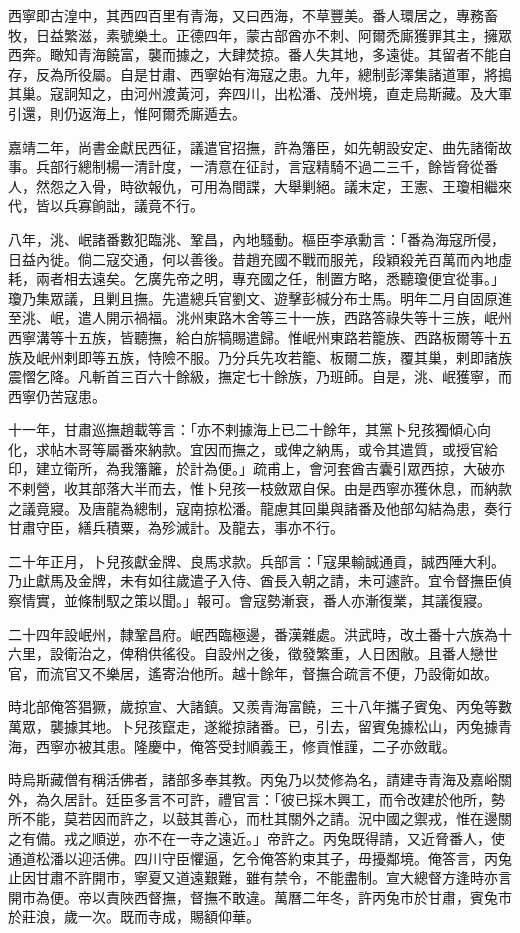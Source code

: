 \begin{pinyinscope}
西寧即古湟中，其西四百里有青海，又曰西海，不草豐美。番人環居之，專務畜牧，日益繁滋，素號樂土。正德四年，蒙古部酋亦不刺、阿爾禿廝獲罪其主，擁眾西奔。瞰知青海饒富，襲而據之，大肆焚掠。番人失其地，多遠徙。其留者不能自存，反為所役屬。自是甘肅、西寧始有海寇之患。九年，總制彭澤集諸道軍，將搗其巢。寇詗知之，由河州渡黃河，奔四川，出松潘、茂州境，直走烏斯藏。及大軍引還，則仍返海上，惟阿爾禿廝遁去。

嘉靖二年，尚書金獻民西征，議遣官招撫，許為籓臣，如先朝設安定、曲先諸衛故事。兵部行總制楊一清計度，一清意在征討，言寇精騎不過二三千，餘皆脅從番人，然怨之入骨，時欲報仇，可用為間諜，大舉剿絕。議末定，王憲、王瓊相繼來代，皆以兵寡餉詘，議竟不行。

八年，洮、岷諸番數犯臨洮、鞏昌，內地騷動。樞臣李承勳言：「番為海寇所侵，日益內徙。倘二寇交通，何以善後。昔趙充國不戰而服羌，段穎殺羌百萬而內地虛耗，兩者相去遠矣。乞廣先帝之明，專充國之任，制置方略，悉聽瓊便宜從事。」瓊乃集眾議，且剿且撫。先遣總兵官劉文、遊擊彭椷分布士馬。明年二月自固原進至洮、岷，遣人開示禍福。洮州東路木舍等三十一族，西路答祿失等十三族，岷州西寧溝等十五族，皆聽撫，給白旂犒賜遣歸。惟岷州東路若籠族、西路板爾等十五族及岷州剌即等五族，恃險不服。乃分兵先攻若籠、板爾二族，覆其巢，剌即諸族震慴乞降。凡斬首三百六十餘級，撫定七十餘族，乃班師。自是，洮、岷獲寧，而西寧仍苦寇患。

十一年，甘肅巡撫趙載等言：「亦不剌據海上已二十餘年，其黨卜兒孩獨傾心向化，求帖木哥等屬番來納款。宜因而撫之，或俾之納馬，或令其遣質，或授官給印，建立衛所，為我籓籬，於計為便。」疏甫上，會河套酋吉囊引眾西掠，大破亦不剌營，收其部落大半而去，惟卜兒孩一枝斂眾自保。由是西寧亦獲休息，而納款之議竟寢。及唐龍為總制，寇南掠松潘。龍慮其回巢與諸番及他部勾結為患，奏行甘肅守臣，繕兵積粟，為殄滅計。及龍去，事亦不行。

二十年正月，卜兒孩獻金牌、良馬求款。兵部言：「寇果輸誠通貢，誠西陲大利。乃止獻馬及金牌，未有如往歲遣子入侍、酋長入朝之請，未可遽許。宜令督撫臣偵察情實，並條制馭之策以聞。」報可。會寇勢漸衰，番人亦漸復業，其議復寢。

二十四年設岷州，隸鞏昌府。岷西臨極邊，番漢雜處。洪武時，改土番十六族為十六里，設衛治之，俾稍供徭役。自設州之後，徵發繁重，人日困敝。且番人戀世官，而流官又不樂居，遙寄治他所。越十餘年，督撫合疏言不便，乃設衛如故。

時北部俺答猖獗，歲掠宣、大諸鎮。又羨青海富饒，三十八年攜子賓兔、丙兔等數萬眾，襲據其地。卜兒孩竄走，遂縱掠諸番。已，引去，留賓兔據松山，丙兔據青海，西寧亦被其患。隆慶中，俺答受封順義王，修貢惟謹，二子亦斂戢。

時烏斯藏僧有稱活佛者，諸部多奉其教。丙兔乃以焚修為名，請建寺青海及嘉峪關外，為久居計。廷臣多言不可許，禮官言：「彼已採木興工，而令改建於他所，勢所不能，莫若因而許之，以鼓其善心，而杜其關外之請。況中國之禦戎，惟在邊關之有備。戎之順逆，亦不在一寺之遠近。」帝許之。丙兔既得請，又近脅番人，使通道松潘以迎活佛。四川守臣懼逼，乞令俺答約束其子，毋擾鄰境。俺答言，丙兔止因甘肅不許開市，寧夏又道遠艱難，雖有禁令，不能盡制。宣大總督方逢時亦言開市為便。帝以責陜西督撫，督撫不敢違。萬曆二年冬，許丙兔市於甘肅，賓兔市於莊浪，歲一次。既而寺成，賜額仰華。


\end{pinyinscope}

